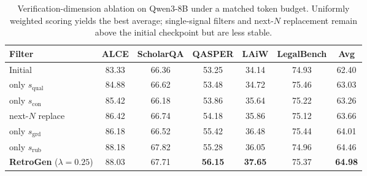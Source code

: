 \begin{table}[!t]
\centering
\small
\setlength{\tabcolsep}{6pt}
\renewcommand{\arraystretch}{1.05}
\begin{tabular}{lcccccc}
\toprule
\textbf{Filter} & \textbf{ALCE} & \textbf{ScholarQA} & \textbf{QASPER} & \textbf{LAiW} & \textbf{LegalBench} & \textbf{Avg} \\
\midrule
Initial & 83.33 & 66.36 & 53.25 & 34.14 & 74.93 & 62.40 \\
only $s_{\mathrm{qual}}$ & 84.88 & 66.62 & 53.48 & 34.72 & 75.46 & 63.03 \\
only $s_{\mathrm{con}}$ & 85.42 & 66.18 & 53.86 & 35.64 & 75.22 & 63.26 \\
next-$N$ replace & 86.42 & 66.74 & 54.18 & 35.86 & 75.12 & 63.66 \\
only $s_{\mathrm{grd}}$ & 86.18 & 66.52 & 55.42 & 36.48 & 75.44 & 64.01 \\
only $s_{\mathrm{rub}}$ & 88.18 & 67.82 & 55.28 & 36.05 & 74.96 & 64.46 \\
\textbf{RetroGen} ($\lambda{=}0.25$) & 88.03 & 67.71 & \textbf{56.15} & \textbf{37.65} & 75.37 & \textbf{64.98} \\
\bottomrule
\end{tabular}
\caption{Verification-dimension ablation on Qwen3-8B under a matched token budget. Uniformly weighted scoring yields the best average; single-signal filters and next-$N$ replacement remain above the initial checkpoint but are less stable.}
\label{tab:verifier_ablation}
\end{table}
